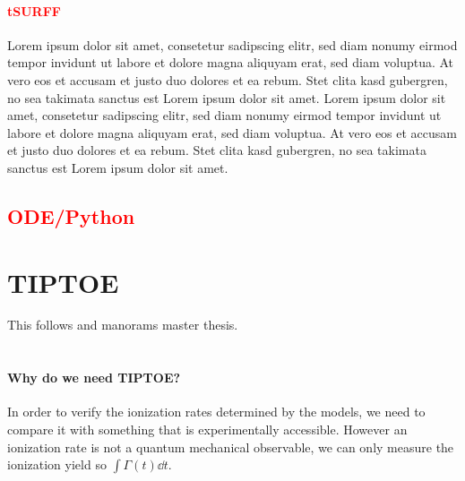 \paragraph{\textcolor{red}{tSURFF}}
Lorem ipsum dolor sit amet, consetetur sadipscing elitr, sed diam nonumy eirmod tempor invidunt ut labore et dolore magna aliquyam erat, sed diam voluptua. At vero eos et accusam et justo duo dolores et ea rebum. Stet clita kasd gubergren, no sea takimata sanctus est Lorem ipsum dolor sit amet. Lorem ipsum dolor sit amet, consetetur sadipscing elitr, sed diam nonumy eirmod tempor invidunt ut labore et dolore magna aliquyam erat, sed diam voluptua. At vero eos et accusam et justo duo dolores et ea rebum. Stet clita kasd gubergren, no sea takimata sanctus est Lorem ipsum dolor sit amet.







\subsection{\textcolor{red}{ODE/Python}}





\section{TIPTOE}
This follows \cite{Park:18} and manorams master thesis.\\\\
\paragraph{Why do we need TIPTOE?} 
In order to verify the ionization rates determined by the models, we need to compare it with something that is experimentally accessible.
However an ionization rate is not a quantum mechanical observable, we can only measure the ionization yield so $\int \Gamma(t) \dd t$.

